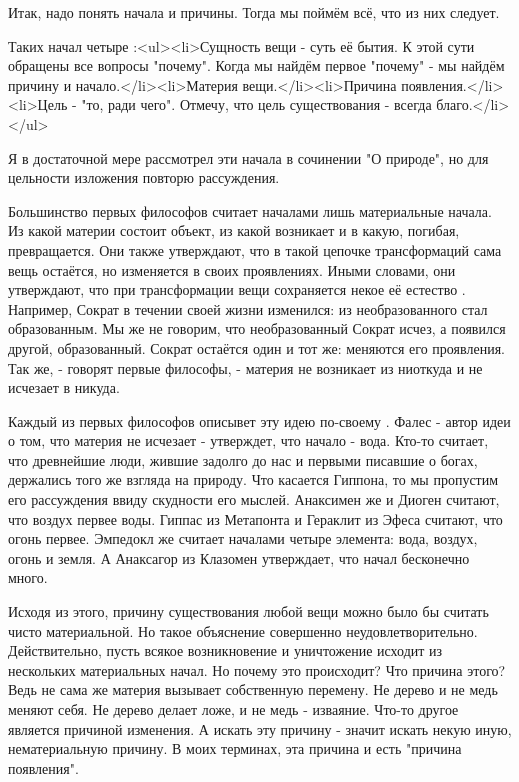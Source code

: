 \documentclass{article}
\begin{document}
Итак, надо понять начала и причины. Тогда мы поймём всё, что из них следует.

Таких начал четыре
\footnotemark[1]
:<ul><li>Сущность вещи - суть её бытия. К этой сути обращены все вопросы "почему". Когда мы найдём первое "почему" - мы найдём причину и начало.</li><li>Материя вещи.</li><li>Причина появления.</li><li>Цель - "то, ради чего". Отмечу, что цель существования - всегда благо.</li></ul>

Я в достаточной мере рассмотрел эти начала в сочинении "О природе", но для цельности изложения повторю рассуждения.

Большинство первых философов считает началами лишь материальные начала. Из какой материи состоит объект, из какой возникает и в какую, погибая, превращается. Они также утверждают, что в такой цепочке трансформаций сама вещь остаётся, но изменяется в своих проявлениях. Иными словами, они утверждают, что при трансформации вещи сохраняется некое её естество
\footnotemark[2]
. Например, Сократ в течении своей жизни изменился: из необразованного стал образованным. Мы же не говорим, что необразованный Сократ исчез, а появился другой, образованный. Сократ остаётся один и тот же: меняются его проявления. Так же, - говорят первые философы, - материя не возникает из ниоткуда и не исчезает в никуда.

Каждый из первых философов описывет эту идею по-своему
\footnotemark[3]
. Фалес
\footnotemark[4]
- автор идеи о том, что материя не исчезает - утверждет, что начало - вода. Кто-то считает, что древнейшие люди, жившие задолго до нас и первыми писавшие о богах, держались того же взгляда на природу. Что касается Гиппона, то мы пропустим его рассуждения ввиду скудности его мыслей. Анаксимен же и Диоген считают, что воздух первее воды. Гиппас из Метапонта и Гераклит из Эфеса считают, что огонь первее. Эмпедокл же считает началами четыре элемента: вода, воздух, огонь и земля. А Анаксагор из Клазомен утверждает, что начал бесконечно много.

Исходя из этого, причину существования любой вещи можно было бы считать чисто материальной. Но такое объяснение совершенно неудовлетворительно. Действительно, пусть всякое возникновение и уничтожение исходит из нескольких материальных начал. Но почему это происходит? Что причина этого? Ведь не сама же материя вызывает собственную перемену. Не дерево и не медь меняют себя. Не дерево делает ложе, и не медь - изваяние. Что-то другое является причиной изменения. А искать эту причину - значит искать некую иную, нематериальную причину. В моих терминах, эта причина и есть "причина появления".
\end{document}
